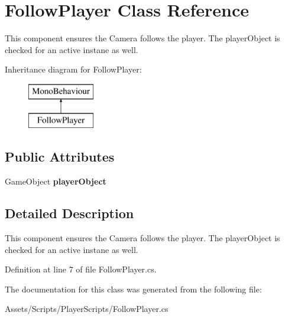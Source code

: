 \hypertarget{class_follow_player}{\section{Follow\+Player Class Reference}
\label{class_follow_player}
}


This component ensures the Camera follows the player. The player\+Object is checked for an active instane as well.  


Inheritance diagram for Follow\+Player\+:\begin{figure}[H]
\begin{center}
\leavevmode
\includegraphics[height=2.000000cm]{class_follow_player}
\end{center}
\end{figure}
\subsection*{Public Attributes}
\begin{DoxyCompactItemize}
\item 
\hypertarget{class_follow_player_a9e8f8c2056e1c3e3dd80d14536adabcd}{Game\+Object {\bfseries player\+Object}}\label{class_follow_player_a9e8f8c2056e1c3e3dd80d14536adabcd}

\end{DoxyCompactItemize}


\subsection{Detailed Description}
This component ensures the Camera follows the player. The player\+Object is checked for an active instane as well. 



Definition at line 7 of file Follow\+Player.\+cs.



The documentation for this class was generated from the following file\+:\begin{DoxyCompactItemize}
\item 
Assets/\+Scripts/\+Player\+Scripts/Follow\+Player.\+cs\end{DoxyCompactItemize}

